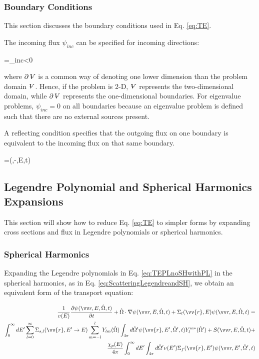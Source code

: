 \subsubsection{Boundary Conditions}

This section discusses the boundary conditions used in Eq. \eqref{eq:TE}.

The incoming flux \(\psi_{inc}\) can be specified for incoming directions:

\beq
\psi\spa =\psi_{inc}\quad{}\in \partial \volume\quad\hO  \cdot{}<0
\eeq

where \(\partial\volume\) is a common way of denoting one lower dimension than the problem domain \(\volume\). Hence, if the problem is 2-D, \(\volume\) represents the two-dimensional domain, while \(\partial \volume\) represents the one-dimensional boundaries. For eigenvalue problems, \(\psi_{inc}=0\) on all boundaries because an eigenvalue problem is defined such that there are no external sources present. 

A reflecting condition specifies that the outgoing flux on one boundary is equivalent to the incoming flux on that same boundary.

\beq
\psi\spa =\psi(,-\hO  ,E,t)\quad{}\in\partial \volume
\eeq

\subsection{Legendre Polynomial and Spherical Harmonics Expansions}
This section will show how to reduce Eq. \eqref{eq:TE} to simpler forms by expanding cross sections and flux in Legendre polynomials or spherical harmonics.

\subsubsection{Spherical Harmonics}

Expanding the Legendre polynomials in Eq. \eqref{eq:TEPLnoSHwithPL} in the spherical harmonics, as in Eq. \ref{eq:ScatteringLegendreandSH}, we obtain an equivalent form of the transport equation:

\begin{equation}
\label{eq:TEPLnomoments}
\begin{aligned}
\frac{1}{v(E)} \frac{\partial\psi\spa }{\partial t} +
 \hO  \cdot\nabla\psi\spa  + 
 \Sigma_t(\vv{r},E)\psi\spa  = \\
 \int_{0}^{\infty}dE' \sum_{l=0}^{\infty} \Sigma_{s,l}(\vv{r}, E'\rightarrow E) \sum_{m=-l}^{l} Y_{lm}(\hO  )\int_{4\pi}^{} d\hO  '\psi(\vv{r}, E', \hO  ', t)Y_l^{m*}(\hO  ') + S\spa +\\
 \frac{\chi_p(E)}{4\pi} \int_{0}^{\infty} dE'\int_{4\pi}^{} d\hO  '\nu(E')\Sigma_f(\vv{r}, E')\psi\spap\\
\end{aligned}
\end{equation}


